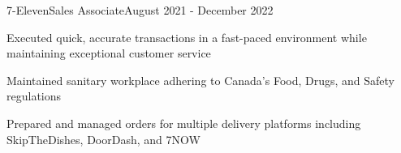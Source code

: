 \begin{resume_employer}{7-Eleven}{Sales Associate}{}{August 2021 - December 2022}
    \item Executed quick, accurate transactions in a fast-paced environment while maintaining exceptional customer service
    \item Maintained sanitary workplace adhering to Canada's Food, Drugs, and Safety regulations
    \item Prepared and managed orders for multiple delivery platforms including SkipTheDishes, DoorDash, and 7NOW
\end{resume_employer}

